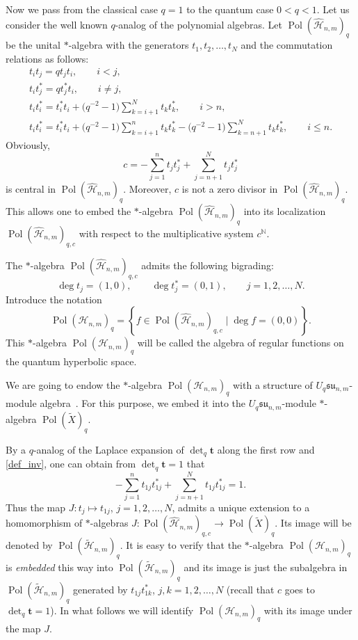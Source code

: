 \documentclass[11pt]{article}
\begin{document}
Now we pass from the classical case $q=1$ to the quantum case $0<q<1$. Let us consider the well known
\cite{RTF} $q$-analog of the polynomial algebras. Let $\operatorname{Pol}(\widehat{\mathscr{H}}_{n,m})_q$
be the unital $*$-algebra with the generators $t_1,t_{2},\ldots,t_N$ and the commutation relations as
follows:
\begin{gather*}
t_it_j = qt_jt_i,\qquad i<j,
\\ t_it_j^* = qt_j^*t_i,\qquad i\ne j,
\\ t_it_i^* = t_i^*t_i+\big(q^{-2}-1\big)\sum_{k=i+1}^Nt_kt_k^*,\qquad i>n,
\\ t_it_i^* = t_i^*t_i+\big(q^{-2}-1\big)\sum_{k=i+1}^nt_kt_k^*-
\big(q^{-2}-1\big)\sum_{k=n+1}^Nt_kt_k^*,\qquad i\le n.
\end{gather*}
Obviously, \[c=-\sum_{j=1}^nt_jt_j^*+\sum_{j=n+1}^Nt_jt_j^*\] is central in
$\operatorname{Pol}(\widehat{\mathscr{H}}_{n,m})_q$. Moreover, $c$ is not a zero divisor in
$\operatorname{Pol}(\widehat{\mathscr{H}}_{n,m})_q$. This allows one to embed the $*$-algebra
$\operatorname{Pol}(\widehat{\mathscr{H}}_{n,m})_q$ into its localization
$\operatorname{Pol}(\widehat{\mathscr{H}}_{n,m})_{q,c}$ with respect to the multiplicative system
$c^{\mathbb{N}}$.

The $*$-algebra $\operatorname{Pol}(\widehat{\mathscr{H}}_{n,m})_{q,c}$ admits the following bigrading:
\[\deg t_{j}=(1,0),\qquad\deg t_j^*=(0,1),\qquad j=1,2,\ldots,N.\] Introduce the notation
\[
\operatorname{Pol}(\mathscr{H}_{n,m})_q=\left\{ f\in
\operatorname{Pol}(\widehat{\mathscr{H}}_{n,m})_{q,c} \; \big|\; \deg f=(0,0)\right\}.
\]
This $*$-algebra $\operatorname{Pol}(\mathscr{H}_{n,m})_q$ will be called the algebra of regular functions on
the quantum hyperbolic space.



We are going to endow the $*$-algebra $\operatorname{Pol}(\mathscr{H}_{n,m})_q$ with a structure of
$U_{q}\mathfrak{su}_{n,m}$-module algebra~\cite{Ch-P}. For this purpose, we embed it into the
$U_{q}\mathfrak{su}_{n,m}$-module $*$-algebra $\operatorname{Pol}(\widetilde{X})_q$.

By a $q$-analog of the Laplace expansion of $\det_q \mathbf{t}$ along the f\/irst row \cite[Section~9.2]{Kl-Sch} and
\eqref{def_inv}, one can obtain from $\det_q \mathbf{t}=1$ that
\[
-\sum_{j=1}^nt_{1j}t_{1j}^*+\sum_{j=n+1}^Nt_{1j}t_{1j}^*=1.
\]
Thus the map $J:t_j\mapsto t_{1j}$, $j=1,2,\ldots,N$, admits a unique extension to a homomorphism of
$*$-algebras $J:\operatorname{Pol}(\widehat{\mathscr{H}}_{n,m})_{q,c}\to
\operatorname{Pol}(\widetilde{X})_q$. Its image will be denoted by
$\operatorname{Pol}(\widetilde{\mathscr{H}}_{n,m})_q$. It is easy to verify that the $*$-algebra
$\operatorname{Pol}(\mathscr{H}_{n,m})_q$ is {\it embedded} this way into
$\operatorname{Pol}(\widetilde{\mathscr{H}}_{n,m})_q$ and its image is just the subalgebra in
$\operatorname{Pol}(\widetilde{\mathscr{H}}_{n,m})_q$ generated by $t_{1j}t_{1k}^*$, $j,k=1,2,\ldots,N$
(recall that $c$ goes to $\det_q \mathbf{t}=1$). In what follows we will identify
$\operatorname{Pol}(\mathscr{H}_{n,m})_q$ with its image under the map $J$.
\end{document}
